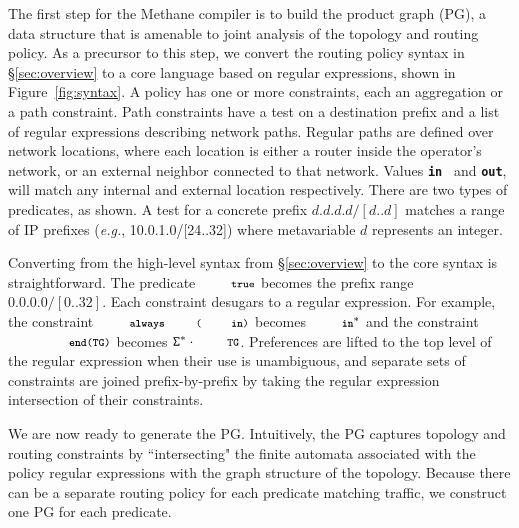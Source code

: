 \documentclass[numbers, 10pt, preprint]{sigplanconf}
\newcommand{\EG}{\emph{e.g.}}
\newcommand{\sysname}{{\small \sf Methane}\xspace}
\newcommand{\CD}[1]{\texttt{\small #1}}  %
\newcommand{\KW}[1]{\texttt{\small\bfseries{#1}}}
\newcommand{\True}{\CD{true}}
\newcommand{\Prefer}{\texttt{>>}}
\newcommand{\Path}{\texttt{=>}}
\newcommand{\In}{\KW{in}}
\newcommand{\Out}{\KW{out}}
\newcommand{\Exit}{\KW{exit}}
\newcommand{\End}{\KW{end}}
\newcommand{\Always}{\KW{always}}
\begin{document}
The first step for the \sysname compiler is to build the product graph (PG), a data structure that is amenable to joint analysis of the topology and routing policy. As a precursor to this step, we convert the routing policy syntax in \S\ref{sec:overview} to a core language based on regular expressions, shown in Figure~\ref{fig:syntax}.
%
A policy has one or more constraints, each an aggregation or a path constraint. Path constraints have a test on a destination prefix and a list of regular expressions describing network paths. Regular paths are defined over network locations, where each location is either a router inside the operator's network, or an external neighbor connected to that network. Values \In~ and \Out, will match any internal and external location respectively. There are two types of predicates, as shown. A test for a concrete prefix $d.d.d.d/[d..d]$ matches a range of IP prefixes (\EG, 10.0.1.0/[24..32]) where metavariable $d$ represents an integer.

Converting from the high-level syntax from \S\ref{sec:overview} to the core syntax is straightforward. The predicate $\True$ becomes the prefix range $0.0.0.0/[0..32]$.
%
Each constraint desugars to a regular expression. For example, the constraint $\Always\CD{(\In)}$ becomes $\In^*$ and the constraint $\CD{\End(TG)}$ becomes $\mathtt{\Sigma}^* \cdot \CD{TG}$.
%
Preferences are lifted to the top level of the regular expression when their use is unambiguous, and separate sets of constraints are joined prefix-by-prefix by taking the regular expression intersection of their constraints.

%
%

We are now ready to generate the PG. Intuitively, the PG captures topology and routing constraints by ``intersecting" the finite automata associated with the policy regular expressions with the graph structure of the topology.
%
%
Because there can be a separate routing policy for each predicate matching traffic, we construct one PG for each predicate.
\end{document}
